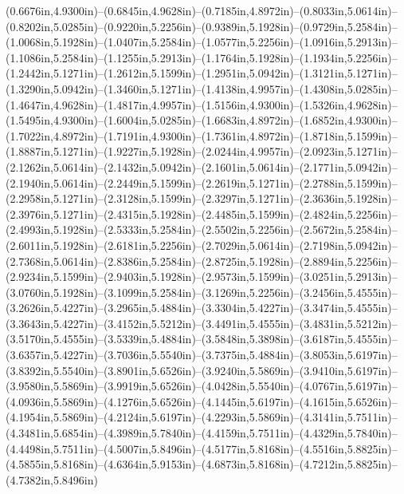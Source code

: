 (0.6676in,4.9300in)--(0.6845in,4.9628in)--(0.7185in,4.8972in)--(0.8033in,5.0614in)--(0.8202in,5.0285in)--(0.9220in,5.2256in)--(0.9389in,5.1928in)--(0.9729in,5.2584in)--(1.0068in,5.1928in)--(1.0407in,5.2584in)--(1.0577in,5.2256in)--(1.0916in,5.2913in)--(1.1086in,5.2584in)--(1.1255in,5.2913in)--(1.1764in,5.1928in)--(1.1934in,5.2256in)--(1.2442in,5.1271in)--(1.2612in,5.1599in)--(1.2951in,5.0942in)--(1.3121in,5.1271in)--(1.3290in,5.0942in)--(1.3460in,5.1271in)--(1.4138in,4.9957in)--(1.4308in,5.0285in)--(1.4647in,4.9628in)--(1.4817in,4.9957in)--(1.5156in,4.9300in)--(1.5326in,4.9628in)--(1.5495in,4.9300in)--(1.6004in,5.0285in)--(1.6683in,4.8972in)--(1.6852in,4.9300in)--(1.7022in,4.8972in)--(1.7191in,4.9300in)--(1.7361in,4.8972in)--(1.8718in,5.1599in)--(1.8887in,5.1271in)--(1.9227in,5.1928in)--(2.0244in,4.9957in)--(2.0923in,5.1271in)--(2.1262in,5.0614in)--(2.1432in,5.0942in)--(2.1601in,5.0614in)--(2.1771in,5.0942in)--(2.1940in,5.0614in)--(2.2449in,5.1599in)--(2.2619in,5.1271in)--(2.2788in,5.1599in)--(2.2958in,5.1271in)--(2.3128in,5.1599in)--(2.3297in,5.1271in)--(2.3636in,5.1928in)--(2.3976in,5.1271in)--(2.4315in,5.1928in)--(2.4485in,5.1599in)--(2.4824in,5.2256in)--(2.4993in,5.1928in)--(2.5333in,5.2584in)--(2.5502in,5.2256in)--(2.5672in,5.2584in)--(2.6011in,5.1928in)--(2.6181in,5.2256in)--(2.7029in,5.0614in)--(2.7198in,5.0942in)--(2.7368in,5.0614in)--(2.8386in,5.2584in)--(2.8725in,5.1928in)--(2.8894in,5.2256in)--(2.9234in,5.1599in)--(2.9403in,5.1928in)--(2.9573in,5.1599in)--(3.0251in,5.2913in)--(3.0760in,5.1928in)--(3.1099in,5.2584in)--(3.1269in,5.2256in)--(3.2456in,5.4555in)--(3.2626in,5.4227in)--(3.2965in,5.4884in)--(3.3304in,5.4227in)--(3.3474in,5.4555in)--(3.3643in,5.4227in)--(3.4152in,5.5212in)--(3.4491in,5.4555in)--(3.4831in,5.5212in)--(3.5170in,5.4555in)--(3.5339in,5.4884in)--(3.5848in,5.3898in)--(3.6187in,5.4555in)--(3.6357in,5.4227in)--(3.7036in,5.5540in)--(3.7375in,5.4884in)--(3.8053in,5.6197in)--(3.8392in,5.5540in)--(3.8901in,5.6526in)--(3.9240in,5.5869in)--(3.9410in,5.6197in)--(3.9580in,5.5869in)--(3.9919in,5.6526in)--(4.0428in,5.5540in)--(4.0767in,5.6197in)--(4.0936in,5.5869in)--(4.1276in,5.6526in)--(4.1445in,5.6197in)--(4.1615in,5.6526in)--(4.1954in,5.5869in)--(4.2124in,5.6197in)--(4.2293in,5.5869in)--(4.3141in,5.7511in)--(4.3481in,5.6854in)--(4.3989in,5.7840in)--(4.4159in,5.7511in)--(4.4329in,5.7840in)--(4.4498in,5.7511in)--(4.5007in,5.8496in)--(4.5177in,5.8168in)--(4.5516in,5.8825in)--(4.5855in,5.8168in)--(4.6364in,5.9153in)--(4.6873in,5.8168in)--(4.7212in,5.8825in)--(4.7382in,5.8496in) 